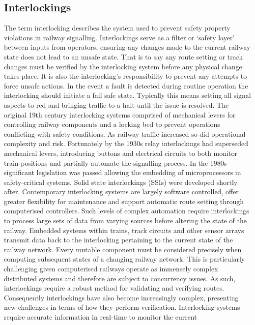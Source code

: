 \documentclass[runningheads]{llncs}
\begin{document}
\subsection{Interlockings}
The term interlocking describes the system used to prevent safety property violations in
railway signalling. Interlockings serve as a filter or ‘safety layer’ between inputs from operators, ensuring any changes made to the current railway state does not lead to an
unsafe state. That is to say any route setting or track changes must be verified by the
interlocking system before any physical change takes place. It is also the interlocking’s
responsibility to prevent any attempts to force unsafe actions. In the event a fault is detected
during routine operation the interlocking should initiate a fail safe state. Typically this
means setting all signal aspects to red and bringing traffic to a halt until the issue is resolved.
The original 19th century interlocking systems comprised of mechanical levers for
controlling railway components and a locking bed to prevent operations conflicting
with safety conditions. As railway traffic increased so did operational complexity and
risk. Fortunately by the 1930s relay interlockings had superseded mechanical levers,
introducing buttons and electrical circuits to both monitor train positions and partially
automate the signalling process. In the 1980s significant legislation was passed allowing
the embedding of microprocessors in safety-critical systems. Solid state interlockings (SSIs)
were developed shortly after. Contemporary interlocking systems are largely software
controlled, offer greater flexibility for maintenance and support automatic route setting
through computerised controllers.
Such levels of complex automation require interlockings to process large sets of data
from varying sources before altering the state of the railway. Embedded systems within
trains, track circuits and other sensor arrays transmit data back to the interlocking pertaining to the current state of the railway network. Every mutable component must be considered precisely when computing subsequent states of a changing railway network.
This is particularly challenging given computerised railways operate as immensely complex
distributed systems and therefore are subject to concurrency issues. As such, interlockings
require a robust method for validating and verifying routes. Consequently interlockings
have also become increasingly complex, presenting new challenges in terms of how they
perform verification.
Interlocking systems require accurate information in real-time to monitor the current
\end{document}
